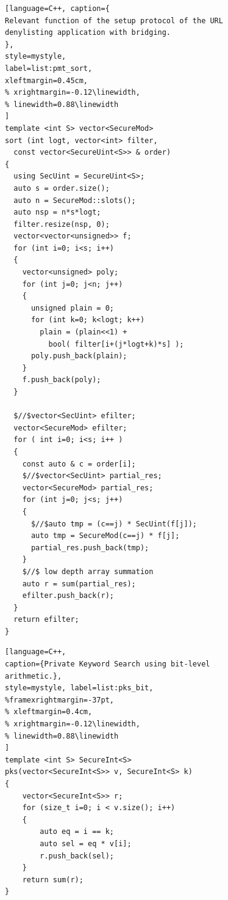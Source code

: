 \begin{figure}[h!]
\begin{minipage}{\linewidth}
\begin{lstlisting}[language=C++, caption={
Relevant function of the setup protocol of the URL denylisting application with bridging.
},
style=mystyle, 
label=list:pmt_sort,
xleftmargin=0.45cm,
% xrightmargin=-0.12\linewidth,
% linewidth=0.88\linewidth
]
template <int S> vector<SecureMod>
sort (int logt, vector<int> filter,
  const vector<SecureUint<S>> & order)
{
  using SecUint = SecureUint<S>;
  auto s = order.size();
  auto n = SecureMod::slots();
  auto nsp = n*s*logt;
  filter.resize(nsp, 0);
  vector<vector<unsigned>> f;
  for (int i=0; i<s; i++)
  {
    vector<unsigned> poly;
    for (int j=0; j<n; j++)
    {
      unsigned plain = 0;
      for (int k=0; k<logt; k++)
        plain = (plain<<1) +
          bool( filter[i+(j*logt+k)*s] );
      poly.push_back(plain);
    }
    f.push_back(poly);
  }
  
  $//$vector<SecUint> efilter;
  vector<SecureMod> efilter;
  for ( int i=0; i<s; i++ )
  {
    const auto & c = order[i];
    $//$vector<SecUint> partial_res;
    vector<SecureMod> partial_res;
    for (int j=0; j<s; j++)
    {
      $//$auto tmp = (c==j) * SecUint(f[j]);
      auto tmp = SecureMod(c==j) * f[j];
      partial_res.push_back(tmp);
    }
    $//$ low depth array summation  
    auto r = sum(partial_res);
    efilter.push_back(r);
  }
  return efilter;
}
\end{lstlisting}
\end{minipage}
\vspace{-0.6 cm}
\end{figure}
\begin{figure}[h]

\noindent\begin{minipage}{.50\textwidth}
\begin{lstlisting}[language=C++,
caption={Private Keyword Search using bit-level arithmetic.},
style=mystyle, label=list:pks_bit,
%framexrightmargin=-37pt,
% xleftmargin=0.4cm,
% xrightmargin=-0.12\linewidth,
% linewidth=0.88\linewidth
]
template <int S> SecureInt<S>
pks(vector<SecureInt<S>> v, SecureInt<S> k)
{
    vector<SecureInt<S>> r;
    for (size_t i=0; i < v.size(); i++)
    {
        auto eq = i == k;
        auto sel = eq * v[i];
        r.push_back(sel);
    }
    return sum(r);
}
\end{lstlisting}
\end{minipage}


\end{figure}

